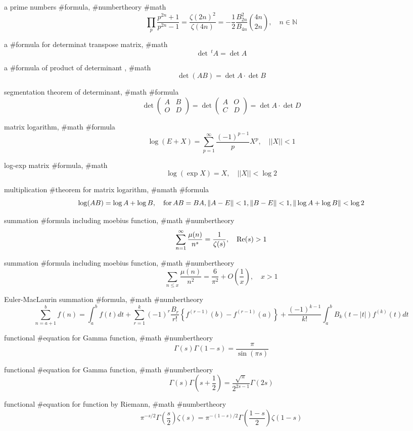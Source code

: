 a prime numbers #formula, #numbertheory #math
$$
\prod_p\frac{p^{2n}+1}{p^{2n}-1}=\frac{\zeta(2n)^2}{\zeta(4n)}=-\frac{1}{2}\frac{B^2_{2n}}{B_{4n}}\binom{4n}{2n}, \quad n\in\mathbb{N}
$$

a #formula for determinat transpose matrix, #math
$$
{\det}\,{}^t A={\det} A
$$

a #formula of product of determinant , #math
$$
{\det}(AB)={\det} A \cdot {\det}B
$$

segmentation theorem of determinant, #math #formula
$$
{\det }\left(
\begin{array}{ll}A & B \\
 O & D
\end{array}
\right)
=
{\det }\left(
\begin{array}{ll}A & O \\
 C & D
\end{array}
\right)
={\det} A\cdot{\det}D
$$

matrix logarithm, #math #formula
$$
\log(E+X)=\sum^\infty_{p=1}\frac{(-1)^{p-1}}{p}X^p, \quad ||X||<1
$$

log-exp matrix #formula, #math
$$
\log(\exp X)=X, \quad ||X||<\log 2
$$

multiplication #theorem for matrix logarithm, #nmath #formula
$$
\log(AB)=\log A+\log B, \quad {\rm for}\, AB=BA, \|A-E\|<1,\|B-E\|<1,\|\log A+\log B\|<\log 2
$$

summation #formula including moebius function, #math #numbertheory
$$
\sum^\infty_{n=1}\frac{\mu(n)}{n^s}=\frac{1}{\zeta(s)}, \quad {\rm Re}(s)>1
$$

summation #formula including moebius function, #math #numbertheory
$$
\sum_{n \le x}\frac{\mu(n)}{n^2}=\frac{6}{\pi^2}+O\left(\frac{1}{x}\right), \quad x>1
$$

Euler-MacLaurin summation #formula, #math #numbertheory
$$
\sum^b_{n=a+1}f(n)=\int^b_a f(t)dt+\sum^k_{r=1}(-1)^r\frac{B_r}{r!}\left\{f^{(r-1)}(b)-f^{(r-1)}(a)\right\}+\frac{(-1)^{k-1}}{k!}\int^b_a B_k(t-|t|)f^{(k)}(t)dt
$$

functional #equation for Gamma function, #math #numbertheory
$$
\Gamma(s)\Gamma(1-s)=\frac{\pi}{\sin(\pi s)}
$$

functional #equation for Gamma function, #math #numbertheory
$$
\Gamma(s)\Gamma\left(s+\frac{1}{2}\right)=\frac{\sqrt{\pi}}{2^{2s-1}}\Gamma(2s)
$$

functional #equation for \zeta function by Riemann, #math #numbertheory
$$
\pi^{-s/2}\Gamma\left(\frac{s}{2}\right)\zeta(s)=\pi^{-(1-s)/2}\Gamma\left(\frac{1-s}{2}\right)\zeta(1-s)
$$

